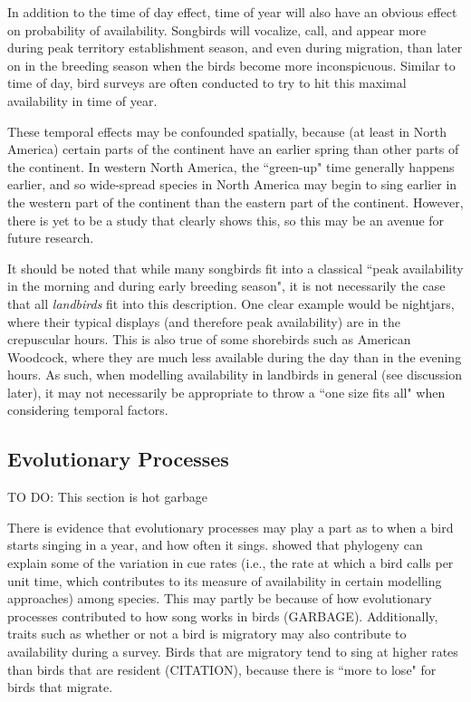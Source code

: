 \par In addition to the time of day effect, time of year will also have an obvious effect on probability of availability.
Songbirds will vocalize, call, and appear more during peak territory establishment season, and even during migration,  than later on in the breeding season when the birds become more inconspicuous.
Similar to time of day, bird surveys are often conducted to try to hit this maximal availability in time of year.

\par These temporal effects may be confounded spatially, because (at least in North America) certain parts of the continent have an earlier spring than other parts of the continent.
In western North America, the ``green-up" time generally happens earlier, and so wide-spread species in North America may begin to sing earlier in the western part of the continent than the eastern part of the continent.
However, there is yet to be a study that clearly shows this, so this may be an avenue for future research.

\par It should be noted that while many songbirds fit into a classical ``peak availability in the morning and during early breeding season", it is not necessarily the case that all \textit{landbirds} fit into this description.
One clear example would be nightjars, where their typical displays (and therefore peak availability) are in the crepuscular hours.
This is also true of some shorebirds such as American Woodcock, where they are much less available during the day than in the evening hours.
As such, when modelling availability in landbirds in general (see discussion later), it may not necessarily be appropriate to throw a ``one size fits all" when considering temporal factors.

\subsection{Evolutionary Processes}
TO DO: This section is hot garbage
\par There is evidence that evolutionary processes may play a part as to when a bird starts singing in a year, and how often it sings. 
\citet{solymos_phylogeny_2018} showed that phylogeny can explain some of the variation in cue rates (i.e., the rate at which a bird calls per unit time, which contributes to its measure of availability in certain modelling approaches) among species. 
This may partly be because of how evolutionary processes contributed to how song works in birds (GARBAGE).
Additionally, traits such as whether or not a bird is migratory may also contribute to availability during a survey.
Birds that are migratory tend to sing at higher rates than birds that are resident (CITATION), because there is ``more to lose" for birds that migrate.

